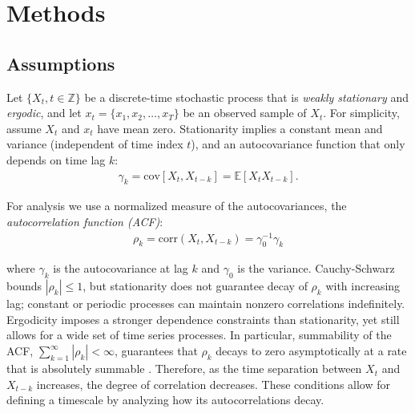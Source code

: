 \documentclass[main.tex]{subfiles}
\begin{document}
\section{Methods}

\subsection{Assumptions} \label{sec:assumptions}

Let $\{X_t, t\in \mathbb{Z}\}$ be a discrete-time stochastic process that is \textit{weakly stationary} and \textit{ergodic}, and let $x_t = \{x_1, x_2, \ldots, x_T\}$ be an observed sample of $X_t$. For simplicity, assume $X_t$ and $x_t$ have mean zero. Stationarity implies a constant mean and variance (independent of time index $t$), and an autocovariance function that only depends on time lag $k$:
\begin{align} 
    \gamma_k = \text{cov}[X_t, X_{t-k}] = \mathbb{E}[X_t X_{t-k}].
\end{align}

\noindent For analysis we use a normalized measure of the autocovariances, the \textit{autocorrelation function (ACF)}:
\begin{align} \label{eq:acf}
\rho_k = \text{corr}(X_t, X_{t-k}) = \gamma_0^{-1}\gamma_k
\end{align}

\noindent where $\gamma_k$ is the autocovariance at lag $k$ and $\gamma_0$ is the variance. Cauchy-Schwarz bounds $|\rho_k|\le 1$, but stationarity does not guarantee decay of $\rho_k$ with increasing lag; constant or periodic processes can maintain nonzero correlations indefinitely. Ergodicity imposes a stronger dependence constraints than stationarity, yet still allows for a wide set of time series processes. In particular, summability of the ACF, $\sum_{k=1}^\infty |\rho_k| < \infty$, guarantees that $\rho_k$ decays to zero asymptotically at a rate that is absolutely summable \citep[Chapter~14.7]{hansen_econometrics_2022}. Therefore, as the time separation between $X_t$ and $X_{t-k}$ increases, the degree of correlation decreases. These conditions allow for defining a timescale by analyzing how its autocorrelations decay.\\
\end{document}
